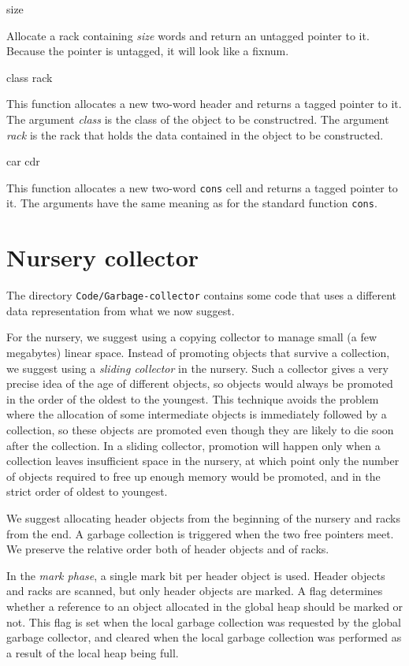  {size}

Allocate a rack containing \textit{size} words and return an untagged
pointer to it.  Because the pointer is untagged, it will look like a
fixnum.

 {class rack}

This function allocates a new two-word header and returns a tagged
pointer to it.  The argument \textit{class} is the class of the object
to be constructred.  The argument \textit{rack} is the rack that holds
the data contained in the object to be constructed.

 {car cdr}

This function allocates a new two-word \texttt{cons} cell and returns
a tagged pointer to it.  The arguments have the same meaning as for
the standard \commonlisp{} function \texttt{cons}.

\section{Nursery collector}
The directory \texttt{Code/Garbage-collector} contains some code that
uses a different data representation from what we now suggest.  

For the nursery, we suggest using a copying collector to manage small
(a few megabytes) linear space.  Instead of promoting objects that
survive a collection, we suggest using a \emph{sliding collector} in
the nursery.  Such a collector gives a very precise idea of the age of
different objects, so objects would always be promoted in the order of
the oldest to the youngest.  This technique avoids the problem where
the allocation of some intermediate objects is immediately followed by
a collection, so these objects are promoted even though they are
likely to die soon after the collection.  In a sliding collector,
promotion will happen only when a collection leaves insufficient space
in the nursery, at which point only the number of objects required to
free up enough memory would be promoted, and in the strict order of
oldest to youngest.

We suggest allocating header objects from the beginning of the nursery
and racks from the end.  A garbage collection is triggered
when the two free pointers meet.  We preserve the relative order both
of header objects and of racks. 

In the \emph{mark phase}, a single mark bit per header object is
used.  Header objects and racks are scanned, but only
header objects are marked.  A flag determines whether a reference to
an object allocated in the global heap should be marked or not.  This
flag is set when the local garbage collection was requested by the
global garbage collector, and cleared when the local garbage
collection was performed as a result of the local heap being full.

